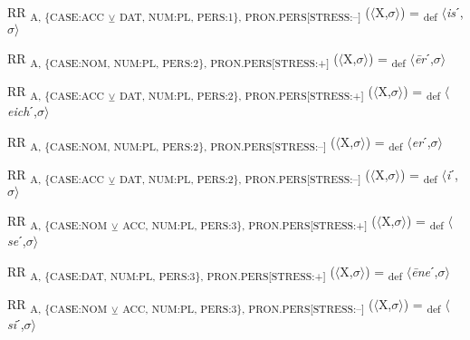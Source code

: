 {\begin{exe}
 RR \textsubscript{A, \{CASE:ACC} \textsubscript{${\veebar}$}\textsubscript{ DAT, NUM:PL, PERS:1\}, PRON.PERS[STRESS:–]} ($\langle$X,$\sigma $$\rangle$) = \textsubscript{def} $\langle$\textit{is}ˊ,$\sigma $$\rangle$
\end{exe}

\begin{exe}
 RR \textsubscript{A, \{CASE:NOM, NUM:PL, PERS:2\}, PRON.PERS[STRESS:+]} ($\langle$X,$\sigma $$\rangle$) = \textsubscript{def} $\langle$\textit{\=er}ˊ,$\sigma $$\rangle$
\end{exe}

\begin{exe}
 RR \textsubscript{A, \{CASE:ACC} \textsubscript{${\veebar}$}\textsubscript{ DAT, NUM:PL, PERS:2\}, PRON.PERS[STRESS:+]} ($\langle$X,$\sigma $$\rangle$) = \textsubscript{def} $\langle$\textit{eich}ˊ,$\sigma $$\rangle$
\end{exe}

\begin{exe}
 RR \textsubscript{A, \{CASE:NOM, NUM:PL, PERS:2\}, PRON.PERS[STRESS:–]} ($\langle$X,$\sigma $$\rangle$) = \textsubscript{def} $\langle$\textit{er}ˊ,$\sigma $$\rangle$
\end{exe}

\begin{exe}
 RR \textsubscript{A, \{CASE:ACC} \textsubscript{${\veebar}$}\textsubscript{ DAT, NUM:PL, PERS:2\}, PRON.PERS[STRESS:–]} ($\langle$X,$\sigma $$\rangle$) = \textsubscript{def} $\langle$\textit{i}ˊ,$\sigma $$\rangle$
\end{exe}

\begin{exe}
 RR \textsubscript{A, \{CASE:NOM} \textsubscript{${\veebar}$}\textsubscript{ ACC, NUM:PL, PERS:3\}, PRON.PERS[STRESS:+]} ($\langle$X,$\sigma $$\rangle$) = \textsubscript{def} $\langle$\textit{se}ˊ,$\sigma $$\rangle$
\end{exe}

\begin{exe}
 RR \textsubscript{A, \{CASE:DAT, NUM:PL, PERS:3\}, PRON.PERS[STRESS:+]} ($\langle$X,$\sigma $$\rangle$) = \textsubscript{def} $\langle$\textit{\=ene}ˊ,$\sigma $$\rangle$
\end{exe}

\begin{exe}
 RR \textsubscript{A, \{CASE:NOM} \textsubscript{${\veebar}$}\textsubscript{ ACC, NUM:PL, PERS:3\}, PRON.PERS[STRESS:–]} ($\langle$X,$\sigma $$\rangle$) = \textsubscript{def} $\langle$\textit{si}ˊ,$\sigma $$\rangle$
\end{exe}

}
